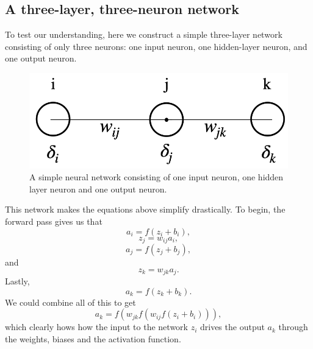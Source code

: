 \documentclass[12pt]{article}
\begin{document}
\subsection{A three-layer, three-neuron network}

To test our understanding, here we construct a simple three-layer network consisting of only three neurons: one input neuron, one hidden-layer neuron, and one output neuron.

 \begin{figure}[h]
\begin{center}
\includegraphics[scale=0.3]{Figs/1layer_nn}
\caption{A simple neural network consisting of one input neuron, one hidden layer neuron and one output neuron.}
\label{1layer_nn}
\end{center}
\end{figure}
This network makes the equations above simplify drastically.  To begin, the forward pass gives us that
\begin{equation}
a_i=f(z_i+b_i),
\end{equation}
\begin{equation}
z_j=w_{ij}a_i,
\end{equation}
\begin{equation}
a_j=f(z_j+b_j),
\end{equation}
and
\begin{equation}
z_k=w_{jk}a_j.
\end{equation}
Lastly,
\begin{equation}
a_k=f(z_k+b_k).
\end{equation}
We could combine all of this to get
\begin{equation}
a_k=f(w_{jk}f(w_{ij}f(z_i+b_i))),
\end{equation}
which clearly hows how the input to the network $z_i$ drives the output $a_k$ through the weights, biases and the activation function.
\end{document}

